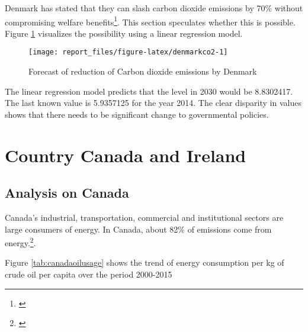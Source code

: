\documentclass[11pt,a4paper,]{article}
\begin{document}
Denmark has stated that they can slash carbon dioxide emissions by 70\% without compromising welfare benefits\footnote{\textcite{reuters}}. This section speculates whether this is possible. Figure \ref{fig:denmarkco2} visualizes the possibility using a linear regression model.

\begin{figure}[H]
\texttt{[image: report\_files/figure-latex/denmarkco2-1]} \caption{Forecast of reduction of Carbon dioxide emissions by Denmark}\label{fig:denmarkco2}
\end{figure}

The linear regression model predicts that the level in 2030 would be 8.8302417. The last known value is 5.9357125 for the year 2014. The clear disparity in values shows that there needs to be significant change to governmental policies.

\section*{Country Canada and Ireland}

\subsection*{Analysis on Canada}

Canada's industrial, transportation, commercial and institutional sectors are large consumers of energy. In Canada, about 82\% of emissions come from energy.\footnote{\textcite{canada1}}.

Figure \ref{tab:canadaoilusage} shows the trend of energy consumption per kg of crude oil per capita over the period 2000-2015
\end{document}

